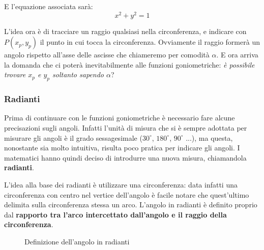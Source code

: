 E l'equazione associata sarà:
\begin{equation*}
    x^2+y^2=1
\end{equation*}

L'idea ora è di tracciare un raggio qualsiasi nella circonferenza, e indicare 
con $P(x_p, y_p)$ il punto in cui tocca la circonferenza. Ovviamente il raggio 
formerà un angolo rispetto all'asse delle ascisse che chiameremo per comodità 
$\alpha$. E ora arriva la domanda che ci poterà inevitabilmente alle funzioni 
goniometriche: \textit{è possibile trovare $x_p$ e $y_p$ soltanto sapendo 
$\alpha$}? 

\subsubsection{Radianti}
Prima di continuare con le funzioni goniometriche è necessario fare alcune 
precisazioni sugli angoli. Infatti l'unità di misura che si è sempre adottata 
per misurare gli angoli è il grado sessagesimale ($30^\circ$, $180^\circ$, 
$90^\circ$ ...), ma questa, nonostante sia molto intuitiva, risulta poco 
pratica per indicare gli angoli. I matematici hanno quindi deciso di introdurre 
una nuova misura, chiamandola \textbf{radianti}.

L'idea alla base dei radianti è utilizzare una circonferenza: data infatti una 
circonferenza con centro nel vertice dell'angolo è facile notare che 
quest'ultimo delimita sulla circonferenza stessa un arco. L'angolo in radianti 
è definito proprio dal \textbf{rapporto tra l'arco intercettato dall'angolo e 
il raggio della circonferenza}.



\begin{figure}
	\begin{center}

	\def\myrad{2cm}
	\def\myang{60}


	\end{center}
	\caption{Definizione dell'angolo in radianti}
\end{figure}



